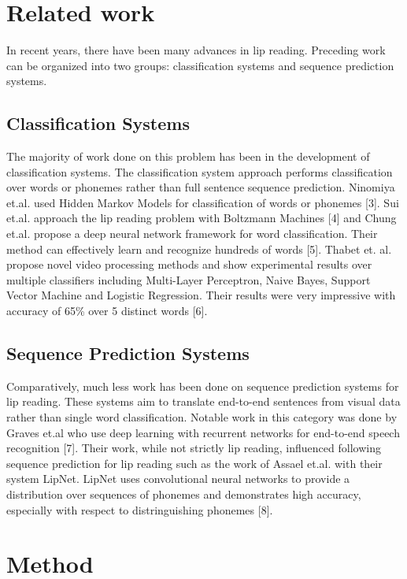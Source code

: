 \documentclass{article}
\begin{document}
\section{Related work}

In recent years, there have been many advances in lip reading. Preceding work can be organized into two groups: classification systems and sequence prediction systems. 

\subsection{Classification Systems}

The majority of work done on this problem has been in the development of classification systems. The classification system approach performs classification over words or phonemes rather than full sentence sequence prediction. Ninomiya et.al. used Hidden Markov Models for classification of words or phonemes [3]. Sui et.al. approach the lip reading problem with Boltzmann Machines [4] and Chung et.al. propose a deep neural network framework for word classification. Their method can effectively learn and recognize hundreds of words [5]. Thabet et. al. propose novel video processing methods and show experimental results over multiple classifiers including Multi-Layer Perceptron, Naive Bayes, Support Vector Machine and Logistic Regression. Their results were very impressive with accuracy of 65\% over 5 distinct words [6].

\subsection{Sequence Prediction Systems}

Comparatively, much less work has been done on sequence prediction systems for lip reading. These systems aim to translate end-to-end sentences from visual data rather than single word classification. Notable work in this category was done by Graves et.al who use deep learning with recurrent networks for end-to-end speech recognition [7]. Their work, while not strictly lip reading, influenced following sequence prediction for lip reading such as the work of Assael et.al. with their system LipNet. LipNet uses convolutional neural networks to provide a distribution over sequences of phonemes and demonstrates high accuracy, especially with respect to distringuishing phonemes [8].

\section{Method}
\end{document}
